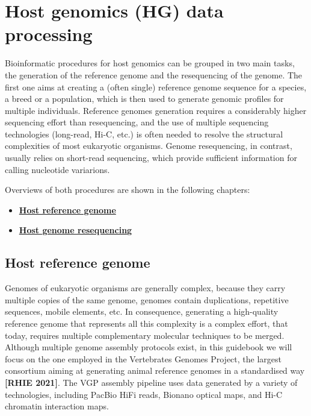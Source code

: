 \documentclass[
]{book}
\providecommand{\tightlist}{%
  \setlength{\itemsep}{0pt}\setlength{\parskip}{0pt}}
\begin{document}
\hypertarget{host-genomics-data-processing}{%
\chapter{Host genomics (HG) data processing}\label{host-genomics-data-processing}}

Bioinformatic procedures for host genomics can be grouped in two main tasks, the generation of the reference genome and the resequencing of the genome. The first one aims at creating a (often single) reference genome sequence for a species, a breed or a population, which is then used to generate genomic profiles for multiple individuals. Reference genomes generation requires a considerably higher sequencing effort than resequencing, and the use of multiple sequencing technologies (long-read, Hi-C, etc.) is often needed to resolve the structural complexities of most eukaryotic organisms. Genome resequencing, in contrast, usually relies on short-read sequencing, which provide sufficient information for calling nucleotide variarions.

Overviews of both procedures are shown in the following chapters:

\begin{itemize}
\tightlist
\item
  \textbf{\protect\hyperlink{host-reference-genome}{Host reference genome}}
\item
  \textbf{\protect\hyperlink{host-resequencing}{Host genome resequencing}}
\end{itemize}

\hypertarget{host-reference-genome}{%
\section{Host reference genome}\label{host-reference-genome}}

Genomes of eukaryotic organisms are generally complex, because they carry multiple copies of the same genome, genomes contain duplications, repetitive sequences, mobile elements, etc. In consequence, generating a high-quality reference genome that represents all this complexity is a complex effort, that today, requires multiple complementary molecular techniques to be merged. Although multiple genome assembly protocols exist, in this guidebook we will focus on the one employed in the Vertebrates Genomes Project, the largest consortium aiming at generating animal reference genomes in a standardised way \textbf{{[}RHIE 2021{]}}. The VGP assembly pipeline uses data generated by a variety of technologies, including PacBio HiFi reads, Bionano optical maps, and Hi-C chromatin interaction maps.
\end{document}
